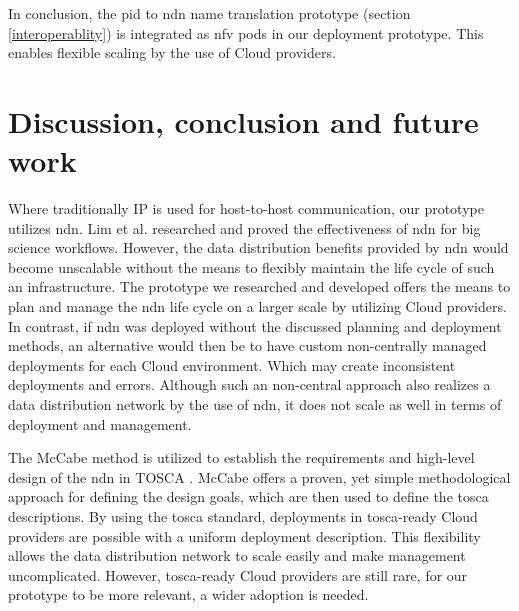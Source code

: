 \documentclass[conference]{IEEEtran}
\begin{document}
In conclusion, the \gls{pid} to \gls{ndn} name translation prototype (section \ref{interoperablity}) is integrated as \gls{nfv} pods in our deployment prototype. This enables flexible scaling by the use of Cloud providers.

\section{Discussion, conclusion and future work}
Where traditionally IP is used for host-to-host communication, our prototype utilizes \gls{ndn}. Lim et al. researched and proved the effectiveness of \gls{ndn} for big science workflows. However, the data distribution benefits provided by \gls{ndn} would become unscalable without the means to flexibly maintain the life cycle of such an infrastructure. The prototype we researched and developed offers the means to plan and manage the \gls{ndn} life cycle on a larger scale by utilizing Cloud providers. In contrast, if \gls{ndn} was deployed without the discussed planning and deployment methods, an alternative would then be to have custom non-centrally managed deployments for each Cloud environment. Which may create inconsistent deployments and errors. Although such an non-central approach also realizes a data distribution network by the use of \gls{ndn}, it does not scale as well in terms of deployment and management.

The McCabe method is utilized to establish the requirements and high-level design of the \gls{ndn} in TOSCA \cite{mccabe2010network}. McCabe offers a proven, yet simple methodological approach for defining the design goals, which are then used to define the \gls{tosca} descriptions. By using the \gls{tosca} standard, deployments in \gls{tosca}-ready Cloud providers are possible with a uniform deployment description. This flexibility allows the data distribution network to scale easily and make management uncomplicated. However, \gls{tosca}-ready Cloud providers are still rare, for our prototype to be more relevant, a wider adoption is needed.

\end{document}
